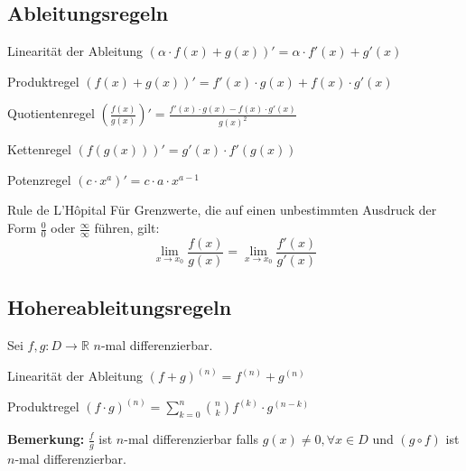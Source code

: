 \documentclass[a4paper,8pt]{extarticle}
\newenvironment{bemerkung}{
   \noindent \textbf{Bemerkung:  }}{}
\def\R{\mathbb{R}}
\begin{document}
\subsection{Ableitungsregeln}

\begin{subbox}{Linearität der Ableitung}
 $(\alpha \cdot f(x) + g(x))' = \alpha \cdot f'(x) + g'(x)$
\end{subbox}

\begin{mainbox}{Produktregel}
 $(f(x) + g(x))' = f'(x) \cdot g(x) + f(x) \cdot g'(x)$
\end{mainbox}

\begin{mainbox}{Quotientenregel}
 $\left(\frac{f(x)}{g(x)}\right)' = \frac{f'(x) \cdot g(x) - f(x) \cdot g'(x)}{g(x)^2}$
\end{mainbox}

\begin{mainbox}{Kettenregel}
 $(f(g(x)))' = g'(x) \cdot f'(g(x))$
\end{mainbox}

\begin{subbox}{Potenzregel}
 $(c \cdot x^a)' = c \cdot a \cdot x^{a - 1}$
\end{subbox}

\begin{mainbox}{Rule de L'Hôpital}
Für Grenzwerte, die auf einen unbestimmten Ausdruck der Form $\frac{0}{0}$ oder $\frac{\infty}{\infty}$ führen, gilt:
\begin{equation*}
  \lim_{x\to x_0} \frac{f(x)}{g(x)} = \lim_{x\to x_0} \frac{f'(x)}{g'(x)}
\end{equation*}
\end{mainbox}

\subsection{Hohereableitungsregeln}
Sei $f, g: D \to \R$ $n$-mal differenzierbar.
\begin{subbox}{Linearität der Ableitung}
  $(f + g) ^{(n)} = f^{(n)} + g^{(n)}$
 \end{subbox}
\begin{mainbox}{Produktregel}
  $(f \cdot g)^{(n)} = \sum_{k=0}^n {n \choose k} f^{(k)} \cdot g^{(n-k)}$
 \end{mainbox}
 \begin{bemerkung}
   $\frac{f}{g}$ ist $n$-mal differenzierbar falls $g(x) \neq 0, \forall x \in D$ und $(g \circ f)$ ist $n$-mal differenzierbar.
 \end{bemerkung}
\end{document}
